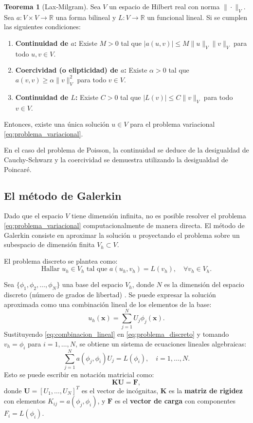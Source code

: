 \documentclass[12pt, letterpaper]{report}
\theoremstyle{definition}
\newtheorem{teorema}{Teorema}[chapter]
\begin{document}
\begin{teorema}[Lax-Milgram]
    Sea $V$ un espacio de Hilbert real con norma $\|\cdot\|_V$. Sea $a: V \times V \to \mathbb{R}$ una forma bilineal y $L: V \to \mathbb{R}$ un funcional lineal. Si se cumplen las siguientes condiciones:
    \begin{enumerate}
        \item \textbf{Continuidad de $a$:} Existe $M > 0$ tal que $|a(u, v)| \leq M \|u\|_V \|v\|_V$ para todo $u, v \in V$.
        \item \textbf{Coercividad (o elipticidad) de $a$:} Existe $\alpha > 0$ tal que $a(v, v) \geq \alpha \|v\|_V^2$ para todo $v \in V$.
        \item \textbf{Continuidad de $L$:} Existe $C > 0$ tal que $|L(v)| \leq C \|v\|_V$ para todo $v \in V$.
    \end{enumerate}
    Entonces, existe una única solución $u \in V$ para el problema variacional \eqref{eq:problema_variacional}.
\end{teorema}

En el caso del problema de Poisson, la continuidad se deduce de la desigualdad de Cauchy-Schwarz y la coercividad se demuestra utilizando la desigualdad de Poincaré.

\subsection{El método de Galerkin}

Dado que el espacio $V$ tiene dimensión infinita, no es posible resolver el problema \eqref{eq:problema_variacional} computacionalmente de manera directa. El método de Galerkin consiste en aproximar la solución $u$ proyectando el problema sobre un subespacio de dimensión finita $V_h \subset V$.

El problema discreto se plantea como:
\begin{equation}\label{eq:problema_discreto}
    \text{Hallar } u_h \in V_h \text{ tal que } a(u_h, v_h) = L(v_h), \quad \forall v_h \in V_h.
\end{equation}

Sea $\{\phi_1, \phi_2, \dots, \phi_N\}$ una base del espacio $V_h$, donde $N$ es la dimensión del espacio discreto (número de grados de libertad) . Se puede expresar la solución aproximada como una combinación lineal de los elementos de la base:
\begin{equation}\label{eq:combinacion_lineal}
    u_h(\mathbf{x}) = \sum_{j=1}^N U_j \phi_j(\mathbf{x}).
\end{equation}
Sustituyendo \eqref{eq:combinacion_lineal} en \eqref{eq:problema_discreto} y tomando $v_h = \phi_i$ para $i=1,\dots,N$, se obtiene un sistema de ecuaciones lineales algebraicas:
\[
\sum_{j=1}^N a(\phi_j, \phi_i) U_j = L(\phi_i), \quad i=1,\dots,N.
\]
Esto se puede escribir en notación matricial como:
\begin{equation}
    \mathbf{K} \mathbf{U} = \mathbf{F},
\end{equation}
donde $\mathbf{U} = [U_1, \dots, U_N]^T$ es el vector de incógnitas, $\mathbf{K}$ es la \textbf{matriz de rigidez} con elementos $K_{ij} = a(\phi_j, \phi_i)$, y $\mathbf{F}$ es el \textbf{vector de carga} con componentes $F_i = L(\phi_i)$.
\end{document}
